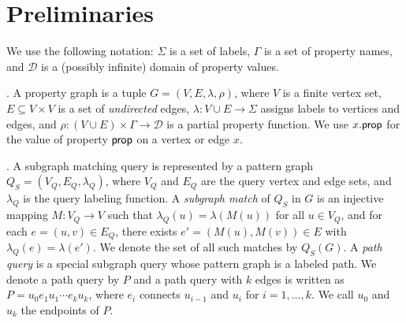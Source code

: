 \section{Preliminaries}
\label{sec:bg}

We use the following notation: $\Sigma$ is a set of labels, $\Gamma$ is
a set of property names, and $\mathcal{D}$ is a (possibly infinite)
domain of property values.

. %
A property graph is a tuple $G=(V,E,\lambda,\rho)$, where $V$ is a
finite vertex set, $E \subseteq V \times V$ is a set of \emph{undirected} edges,
$\lambda: V \cup E \rightarrow \Sigma$ assigns labels to vertices and
edges, and $\rho: (V \cup E)\times \Gamma \rightarrow \mathcal{D}$ is a
partial property function. %
We use $x.{\mathsf{prop}}$ for the value of property ${\mathsf{prop}}$ on a vertex
or edge $x$.

. A subgraph matching query is represented by a pattern
graph $Q_S=(V_Q,E_Q,\lambda_Q)$, where $V_Q$ and $E_Q$ are the query
vertex and edge sets, and $\lambda_Q$ is the query labeling function. A
\emph{subgraph match} of $Q_S$ in $G$ is an injective mapping
$M:V_Q \rightarrow V$ such that $\lambda_Q(u)=\lambda(M(u))$ for all
$u \in V_Q$, and for each $e=(u,v)\in E_Q$, there exists
$e'=(M(u),M(v))\in E$ with $\lambda_Q(e)=\lambda(e')$. We denote the set
of all such matches by $Q_S(G)$. %
A \emph{path query} is a special subgraph query whose pattern graph is a
labeled path. We denote a path query by $P$ and a path query with $k$
edges is written as $P=u_0e_1u_1\cdots e_ku_k$, where $e_i$ connects
$u_{i-1}$ and $u_i$ for $i=1,\ldots,k$. We call $u_0$ and $u_k$ the
endpoints  of $P$.



